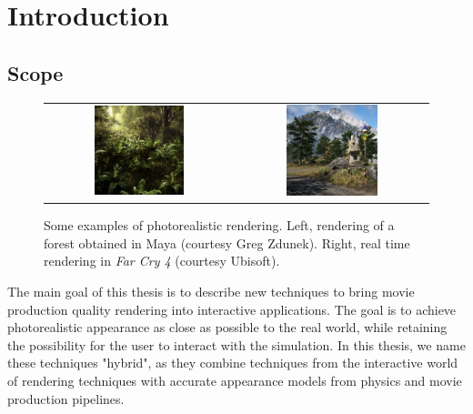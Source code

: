 \chapter{Introduction}


\label{sec:intro}
\section{Scope}

\begin{figure}
\centering
\begin{tabular}{@{}c@{}c@{}}
	 \includegraphics[width=0.5\textwidth]{figures/forest-maya-crop.jpg} & 	 \includegraphics[width=0.5\textwidth]{figures/far-cry-4-crop.jpg} \\
\end{tabular}
\caption{Some examples of photorealistic rendering. Left, rendering of a forest obtained in Maya (courtesy Greg Zdunek). Right, real time rendering in \emph{Far Cry 4} (courtesy Ubisoft). } 
\label{fig:main_examples}
\end{figure}

The main goal of this thesis is to describe new techniques to bring movie production quality rendering into interactive applications.  The goal is to achieve photorealistic appearance as close as possible to the real world, while retaining the possibility for the user to interact with the simulation. In this thesis, we name these techniques "hybrid", as they combine techniques from the interactive world of rendering techniques with accurate appearance models from physics and movie production pipelines.

